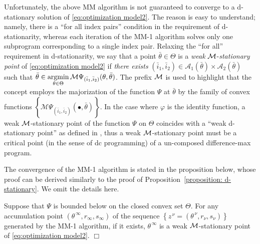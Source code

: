 \documentclass{siamart}
\begin{document}
Unfortunately, the above MM algorithm is not guaranteed to converge to a d-stationary solution of \eqref{eq:optimization model2}.
The reason is easy to understand; namely, there is a ``for all index pairs'' condition in the requirement of d-stationarity, whereas each iteration
of the MM-1 algorithm solves only one subprogram corresponding to a single index pair.  Relaxing the ``for all'' requirement in d-stationarity,
we say that a point $\bar{\theta} \in \Theta$ is a {\sl weak} ${\cal M}$-{\sl stationary point} of \eqref{eq:optimization model2} if
{\sl there exists} $(\bar{i}_1,\bar{i}_2)\in \mathcal{A}_1(\bar{\theta})\times \mathcal{A}_2(\bar{\theta})$ such that
$\bar{\theta} \in \displaystyle{
\operatornamewithlimits{\mbox{argmin}}_{\theta\in \Theta}
} \, \mathcal{M}\Psi_{(\bar{i}_1,\bar{i}_2)}(\theta,\bar{\theta})$.  The prefix ${\cal M}$ is used to highlight that the
concept employs the majorization of the function $\Psi$ at $\bar{\theta}$ by the family of convex functions
$\left\{ \mathcal{M}\Psi_{(\bar{i}_1,\bar{i}_2)}(\bullet,\bar{\theta}) \right\}$.  In the case where $\varphi$ is the
identity function, a weak ${\cal M}$-stationary point of the function $\Psi$ on $\Theta$
coincides with a ``weak d-stationary point'' as defined in \cite[Subsection~3.3]{PangRazaviyaynAlvarado16}, thus
a weak ${\cal M}$-stationary point must be a critical point (in the sense of dc programming)
of a un-composed difference-max program.


The convergence of the MM-1 algorithm is stated in the proposition below, whose proof can be derived similarly to the proof of
Proposition~\ref{proposition: d-stationary}. We omit the details here.


\begin{proposition}\label{prop: weak dstat}
Suppose that $\Psi$ is bounded below on the closed convex set $\Theta$. For any accumulation point $( \theta^{\, \infty},r_{\infty},s_{\infty} )$ of the sequence $\left\{ z^{\, \nu} = ( \theta^{\, \nu}, r_\nu, s_\nu) \right\}$ generated by the MM-1 algorithm, if it exists,
$\theta^{\, \infty}$ is a weak ${\cal M}$-stationary point of \eqref{eq:optimization model2}. \hfill $\Box$
\end{proposition}
\end{document}

